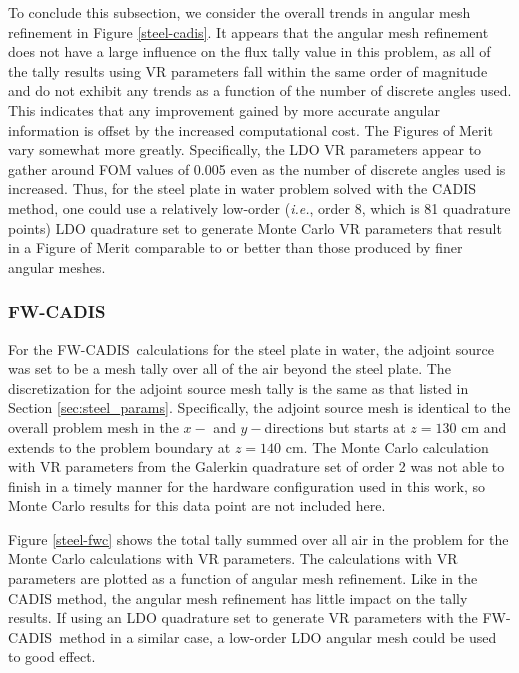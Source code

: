 \documentclass{article} %
\newcommand{\fwc}{\mbox{FW-CADIS}}
\begin{document}
To conclude this subsection, we consider the overall trends in angular mesh
refinement in Figure \ref{steel-cadis}. It
appears that the angular mesh refinement does not have a large influence on the
flux tally value in this problem, as all of the tally results using VR
parameters fall within the same order of magnitude and do not exhibit any
trends as a function of the number of discrete angles used. This indicates
that any improvement gained by more accurate angular information is offset by
the increased computational cost. The Figures of Merit vary somewhat more
greatly. Specifically, the LDO VR parameters appear to gather around FOM
values of 0.005 even as the number of discrete angles used is increased. Thus,
for the steel plate in water problem solved with the CADIS method, one could
use a relatively low-order (\textit{i.e.}, order 8, which is 81 quadrature points) LDO
quadrature set to generate Monte Carlo VR parameters that result in a Figure
of Merit comparable to or better than those produced by finer angular meshes.

\FloatBarrier
\subsubsection{\fwc}

For the \fwc\ calculations for the steel plate in water, the adjoint source
was set to be a mesh tally over all of the air beyond the steel plate. The
discretization for the adjoint source mesh tally is the same as that listed in
Section \ref{sec:steel_params}.  Specifically, the adjoint source mesh is
identical to the overall problem mesh in the $x-$ and $y-$directions but
starts at $z = 130$ cm and extends to the problem boundary at $z = 140$ cm.
The Monte Carlo calculation with VR parameters from the Galerkin
quadrature set of order 2 was not able to finish in a timely manner for the
hardware configuration used in this work, so Monte Carlo results for this data
point are not included here.

Figure \ref{steel-fwc} shows the total tally summed over all air in the
problem for the Monte Carlo calculations with VR parameters. The calculations
with VR parameters are plotted as a function of angular mesh refinement. Like
in the CADIS method, the angular mesh refinement has little impact on the
tally results. If using an LDO quadrature set to generate VR parameters with
the \fwc\ method in a similar case, a low-order LDO angular mesh could be
used to good effect.
\end{document}
